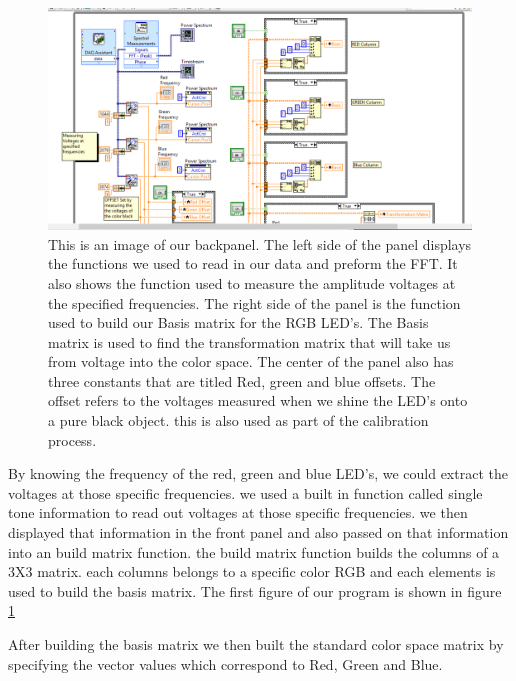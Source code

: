 \documentclass[paper=letter, fontsize=12pt]{article}
\begin{document}
\begin{figure}[H]
\centering
\includegraphics[scale=.4]{backpanel1.png}
\caption{This is an image of our backpanel. The left side of the panel displays the functions we used to read in our data and preform the FFT. It also shows the function used to measure the amplitude voltages at the specified frequencies. The right side of the panel is the function used to build our Basis matrix for the RGB LED's. The Basis matrix is used to find the transformation matrix that will take us from voltage into the color space. The center of the panel also has three constants that are titled Red, green and blue offsets. The offset refers to the voltages measured when we shine the LED's onto a pure black object. this is also used as part of the calibration process.}
\label{backpanel1}
\end{figure}




By knowing the frequency of the red, green and blue LED's, we could extract the voltages at those specific frequencies. we used a built in function called single tone information to read out voltages at those specific frequencies. we then displayed that information in the front panel and also passed on that information into an build matrix function. the build matrix function builds the columns of a 3X3 matrix. each columns belongs to a specific color RGB and each elements is used to build the basis matrix. The first figure of our program is shown in figure \ref*{backpanel1}

After building the basis matrix we then built the standard color space matrix by specifying the vector values which correspond to Red, Green and Blue. 
\end{document}
